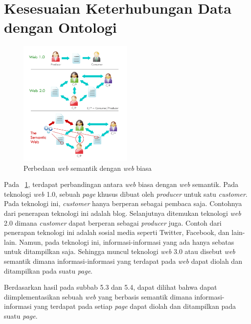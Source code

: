 \section{Kesesuaian Keterhubungan Data dengan Ontologi}

\begin{figure}
	\centering
	\includegraphics[width=0.5\textwidth]
	{pics/semantic-web.jpg}
	\caption{Perbedaan \textit{web} semantik dengan \textit{web} biasa}
	\label{fig:semanticweb}
\end{figure}
\vspace{-0.3cm}

Pada \pic~\ref{fig:semanticweb}, terdapat perbandingan antara \textit{web} biasa dengan \textit{web} semantik. Pada teknologi \textit{web} 1.0, sebuah \textit{page} khusus dibuat oleh \textit{producer} untuk satu \textit{customer}. Pada teknologi ini, \textit{customer} hanya berperan sebagai pembaca saja. Contohnya dari penerapan teknologi ini adalah blog. Selanjutnya ditemukan teknologi \textit{web} 2.0 dimana \textit{customer} dapat berperan sebagai \textit{producer} juga. Contoh dari penerapan teknologi ini adalah sosial media seperti Twitter, Facebook, dan lain-lain. Namun, pada teknologi ini, informasi-informasi yang ada hanya sebatas untuk ditampilkan saja. Sehingga muncul teknologi \textit{web} 3.0 atau disebut \textit{web} semantik dimana informasi-informasi yang terdapat pada \textit{web} dapat diolah dan ditampilkan pada suatu \textit{page}.

Berdasarkan hasil pada subbab 5.3 dan 5.4, dapat dilihat bahwa dapat diimplementasikan sebuah \textit{web} yang berbasis semantik dimana informasi-informasi yang terdapat pada setiap \textit{page} dapat diolah dan ditampilkan pada suatu \textit{page}.

